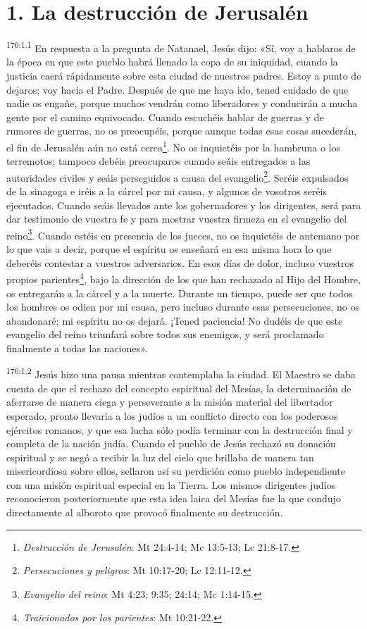 \section*{1. La destrucción de Jerusalén}
\par
\textsuperscript{176:1.1} En respuesta a la pregunta de Natanael, Jesús dijo: «Sí, voy a hablaros de la época en que este pueblo habrá llenado la copa de su iniquidad, cuando la justicia caerá rápidamente sobre esta ciudad de nuestros padres. Estoy a punto de dejaros; voy hacia el Padre. Después de que me haya ido, tened cuidado de que nadie os engañe, porque muchos vendrán como liberadores y conducirán a mucha gente por el camino equivocado. Cuando escuchéis hablar de guerras y de rumores de guerras, no os preocupéis, porque aunque todas esas cosas sucederán, el fin de Jerusalén aún no está cerca\footnote{\textit{Destrucción de Jerusalén}: Mt 24:4-14; Mc 13:5-13; Lc 21:8-17.}. No os inquietéis por la hambruna o los terremotos; tampoco debéis preocuparos cuando seáis entregados a las autoridades civiles y seáis perseguidos a causa del evangelio\footnote{\textit{Persecuciones y peligros}: Mt 10:17-20; Lc 12:11-12.}. Seréis expulsados de la sinagoga e iréis a la cárcel por mi causa, y algunos de vosotros seréis ejecutados. Cuando seáis llevados ante los gobernadores y los dirigentes, será para dar testimonio de vuestra fe y para mostrar vuestra firmeza en el evangelio del reino\footnote{\textit{Evangelio del reino}: Mt 4:23; 9:35; 24:14; Mc 1:14-15.}. Cuando estéis en presencia de los jueces, no os inquietéis de antemano por lo que vais a decir, porque el espíritu os enseñará en esa misma hora lo que deberéis contestar a vuestros adversarios. En esos días de dolor, incluso vuestros propios parientes\footnote{\textit{Traicionados por los parientes}: Mt 10:21-22.}, bajo la dirección de los que han rechazado al Hijo del Hombre, os entregarán a la cárcel y a la muerte. Durante un tiempo, puede ser que todos los hombres os odien por mi causa, pero incluso durante esas persecuciones, no os abandonaré; mi espíritu no os dejará. ¡Tened paciencia! No dudéis de que este evangelio del reino triunfará sobre todos sus enemigos, y será proclamado finalmente a todas las naciones».

\par
\textsuperscript{176:1.2} Jesús hizo una pausa mientras contemplaba la ciudad. El Maestro se daba cuenta de que el rechazo del concepto espiritual del Mesías, la determinación de aferrarse de manera ciega y perseverante a la misión material del libertador esperado, pronto llevaría a los judíos a un conflicto directo con los poderosos ejércitos romanos, y que esa lucha sólo podía terminar con la destrucción final y completa de la nación judía. Cuando el pueblo de Jesús rechazó su donación espiritual y se negó a recibir la luz del cielo que brillaba de manera tan misericordiosa sobre ellos, sellaron así su perdición como pueblo independiente con una misión espiritual especial en la Tierra. Los mismos dirigentes judíos reconocieron posteriormente que esta idea laica del Mesías fue la que condujo directamente al alboroto que provocó finalmente su destrucción.

